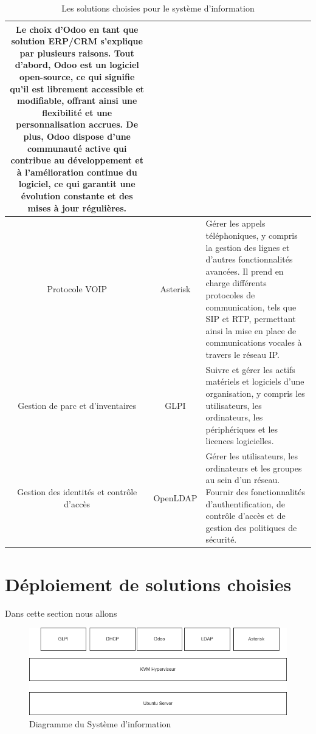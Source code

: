 \begin{table}[H]
\begin{center}
\begin{tabular}{|c{3cm}|c{3cm}|l{10cm}|}
Le choix d'Odoo en tant que solution ERP/CRM s'explique par plusieurs raisons. Tout d'abord, Odoo est un logiciel open-source, ce qui signifie qu'il est librement accessible et modifiable, offrant ainsi une flexibilité et une personnalisation accrues. De plus, Odoo dispose d'une communauté active qui contribue au développement et à l'amélioration continue du logiciel, ce qui garantit une évolution constante et des mises à jour régulières. \\
\hline
Protocole VOIP & Asterisk & Gérer les appels téléphoniques, y compris la gestion des lignes et d'autres fonctionnalités avancées. Il prend en charge différents protocoles de communication, tels que SIP et RTP, permettant ainsi la mise en place de communications vocales à travers le réseau IP. \\
\hline
Gestion de parc et d'inventaires & GLPI & Suivre et gérer les actifs matériels et logiciels d'une organisation, y compris les utilisateurs, les ordinateurs, les périphériques et les licences logicielles. \\
\hline
Gestion des identités et contrôle d'accès & OpenLDAP & Gérer les utilisateurs, les ordinateurs et les groupes au sein d'un réseau. Fournir des fonctionnalités d'authentification, de contrôle d'accès et de gestion des politiques de sécurité. \\
\hline
\end{tabular}
\caption{Les solutions choisies pour le système d'information}
\label{1}
\end{center}
\end{table}


\section{Déploiement de solutions choisies}

Dans cette section nous allons 


\begin{figure}[H]
 \centering
    \includegraphics[width=15cm]{Images/diagsi.png}
    \caption{Diagramme du Système d'information}
    \label{fig:diagramme-SI}
\end{figure}


